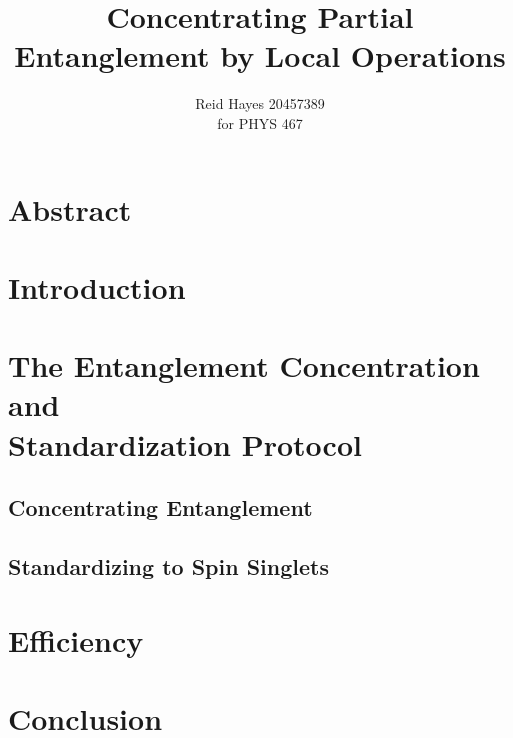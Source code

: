 \documentclass[12pt,letterpaper, titlepage]{article}
\author{Reid Hayes 20457389\\
for PHYS 467}
\title{Concentrating Partial Entanglement by Local Operations}
\begin{document}
\maketitle
\section{Abstract}

\section{Introduction}


\section{The Entanglement Concentration and \\Standardization Protocol}
\subsection{Concentrating Entanglement}
\label{sec:concentrating}


\subsection{Standardizing to Spin Singlets}
\label{sec:standardizing}

\section{Efficiency}

\pagebreak
\section{Conclusion}

\pagebreak
\printbibliography
\end{document}
